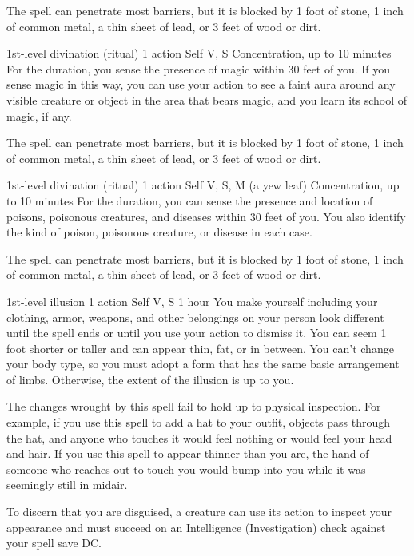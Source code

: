 \documentclass[10pt,twoside,twocolumn,openany]{book}
\begin{document}
The spell can penetrate most barriers, but it is blocked by 1 foot of stone, 1 inch of common metal, a thin sheet of lead, or 3 feet of wood or dirt.

{1st-level divination {\color{ritual}(ritual)}}
{\color{action} 1 action}
{Self}
{V, S}
{{\color{concentration}Concentration}, up to 10 minutes}
%
For the duration, you sense the presence of magic
within 30 feet of you. If you sense magic in this way, you can use your action to see a faint aura around any visible creature or object in the area that bears magic, and you learn its school of magic, if any.

The spell can penetrate most barriers, but it is blocked by 1 foot of stone, 1 inch of common metal, a thin sheet of lead, or 3 feet of wood or dirt.

{1st-level divination {\color{ritual}(ritual)}}
{\color{action} 1 action}
{Self}
{V, S, M (a yew leaf)}
{{\color{concentration}Concentration}, up to 10 minutes}
%
For the duration, you can sense the presence and location of poisons, poisonous creatures, and diseases within 30 feet of you. You also identify the kind of poison, poisonous creature, or disease in each case.

The spell can penetrate most barriers, but it is blocked by 1 foot of stone, 1 inch of common metal, a thin sheet of lead, or 3 feet of wood or dirt.

{1st-level illusion}
{\color{action} 1 action}
{Self}
{V, S}
{1 hour}
%
You make yourself including your clothing, armor, weapons, and other belongings on your person look different until the spell ends or until you use your action to dismiss it. You can seem 1 foot shorter or taller and can appear thin, fat, or in between. You can't change your body type, so you must adopt a form that has the same basic arrangement of limbs. Otherwise, the extent of the illusion is up to you.

The changes wrought by this spell fail to hold up to physical inspection. For example, if you use this spell to add a hat to your outfit, objects pass through the hat, and anyone who touches it would feel nothing or would feel your head and hair. If you use this spell to appear thinner than you are, the hand of someone who reaches out to touch you would bump into you while it was seemingly still in midair.

To discern that you are disguised, a creature can use its action to inspect your appearance and must succeed on an Intelligence (Investigation) check against your spell save DC.
\end{document}
